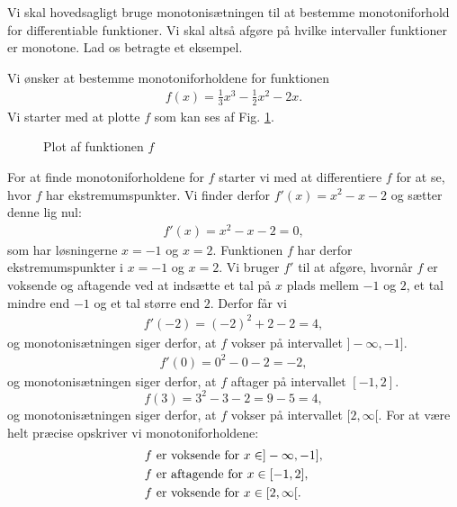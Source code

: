 Vi skal hovedsagligt bruge monotonisætningen til at bestemme monotoniforhold for differentiable funktioner. Vi skal altså afgøre på hvilke intervaller funktioner er monotone. Lad os betragte et eksempel.
\begin{exa}
Vi ønsker at bestemme monotoniforholdene for funktionen 
\begin{align*}
	f(x) = \frac{1}{3}x^3-\frac{1}{2}x^2-2x.
\end{align*}
 Vi starter med at plotte $f$ som kan ses af Fig. \ref{fig:monof}.

\begin{figure}[H]
\centering
{}
\caption{Plot af funktionen $f$}
\label{fig:monof}
\end{figure}
For at finde monotoniforholdene for $f$ starter vi med at differentiere $f$ for at se, hvor $f$ har ekstremumspunkter. Vi finder derfor $f'(x) = x^2-x-2$ og sætter denne lig nul:
\begin{align*}
f'(x)=x^2-x-2 = 0,
\end{align*}
som har løsningerne $x=-1$ og $x=2$. Funktionen $f$ har derfor ekstremumspunkter i $x=-1$ og $x=2$. Vi bruger $f'$ til at afgøre, hvornår $f$ er voksende og aftagende ved at indsætte et tal på $x$ plads mellem $-1$ og $2$, et tal mindre end $-1$ og et tal større end $2$. Derfor får vi
\begin{align*}
f'(-2) = (-2)^2+2-2 = 4, 
\end{align*} 
og monotonisætningen siger derfor, at $f$ vokser på intervallet $]-\infty,-1]$. 
\begin{align*}
f'(0) = 0^2-0-2 = -2,
\end{align*}
og monotonisætningen siger derfor, at $f$ aftager på intervallet $[-1,2]$.
\[ 
f(3) = 3^2-3-2 = 9-5=4,
\]
og monotonisætningen siger derfor, at $f$ vokser på intervallet $[2,\infty[.$
For at være helt præcise opskriver vi monotoniforholdene:
\begin{align*}
	&\textnormal{$f$ er voksende for $x \in ]-\infty,-1]$},\\
	&\textnormal{$f$ er aftagende for $x \in [-1,2]$},\\
	&\textnormal{$f$ er voksende for $x \in [2,\infty[$}.
\end{align*}

\end{exa}
